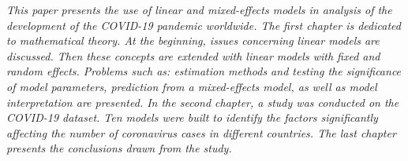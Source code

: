 \documentclass[12pt]{mwbk}
\theoremstyle{plain}
\theoremstyle{definition}
\theoremstyle{definition}
\begin{document}
\bigskip

\begin{center}
  \textbf{\textit{\tytulangielski}}
\end{center}



{\it
This paper presents the use of linear and mixed-effects models in analysis of the development of the COVID-19 pandemic worldwide. The first chapter is dedicated to mathematical theory. At the beginning, issues concerning linear models are discussed. Then these concepts are extended with linear models with fixed and random effects. Problems such as: estimation methods and testing the significance of model parameters, prediction from a mixed-effects model, as well as model interpretation are presented. In the second chapter, a study was conducted on the COVID-19 dataset. Ten models were built to identify the factors significantly affecting the number of coronavirus cases in different countries. The last chapter presents the conclusions drawn from the study.

}
\end{document}
